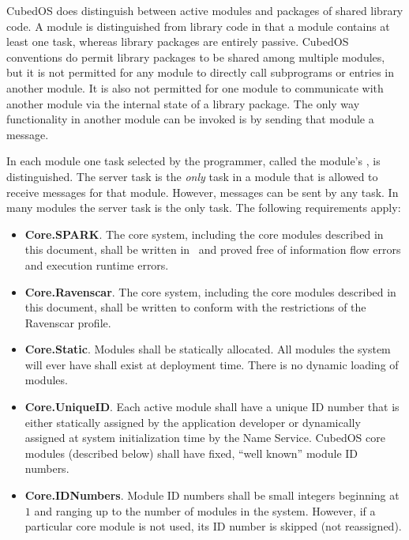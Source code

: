 CubedOS does distinguish between active modules and packages of shared library code. A module is
distinguished from library code in that a module contains at least one task, whereas library
packages are entirely passive. CubedOS conventions do permit library packages to be shared among
multiple modules, but it is not permitted for any module to directly call subprograms or entries
in another module. It is also not permitted for one module to communicate with another module
via the internal state of a library package. 
The only way functionality in another module can be invoked is by sending that module a message.

In each module one task selected by the programmer, called the module's ,
is distinguished. The server task is the \emph{only} task in a module that is allowed to receive
messages for that module. However, messages can be sent by any task. In many modules the server
task is the only task. The following requirements apply:

\begin{itemize}
\item \textbf{Core.SPARK}. The core system, including the core modules described in this
  document, shall be written in \SPARK\ and proved free of information flow errors and execution
  runtime errors.
\item \textbf{Core.Ravenscar}. The core system, including the core modules described in this
  document, shall be written to conform with the restrictions of the Ravenscar profile. 
\item \textbf{Core.Static}. Modules shall be statically allocated. All modules the system will
  ever have shall exist at deployment time. There is no dynamic loading of modules. 
\item \textbf{Core.UniqueID}. Each active module shall have a unique ID number that is either
  statically assigned by the application developer or dynamically assigned at system
  initialization time by the Name Service.  CubedOS core
  modules (described below) shall have fixed, ``well known'' module ID numbers.
\item \textbf{Core.IDNumbers}. Module ID numbers shall be small integers beginning at $1$ and
  ranging up to the number of modules in the system. However, if a particular core module is not
  used, its ID number is skipped (not reassigned). 
\end{itemize}

